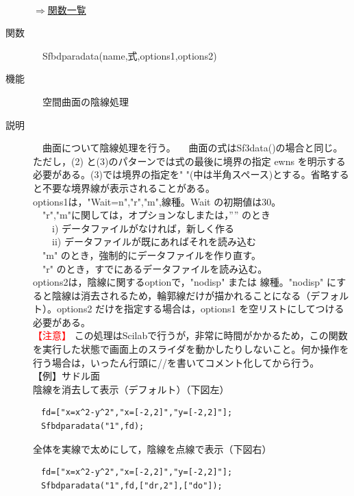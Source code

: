 \documentclass[papersize,a4paper,12pt,uplatex]{jsarticle}
\begin{document}
\begin{description}
　　　　　　\\

\begin{flushright} \hyperlink{functionlist3d}{$\Rightarrow$関数一覧}\end{flushright}

\hypertarget{sfbdparadata}{}
\item[関数]　Sfbdparadata(name,式,options1,options2)
\item[機能]　空間曲面の陰線処理
\item[説明]　曲面について陰線処理を行う。
　曲面の式はSf3data()の場合と同じ。ただし，(2) と(3)のパターンでは式の最後に境界の指定 ewns を明示する必要がある。(3)では境界の指定を" "(中は半角スペース)とする。省略すると不要な境界線が表示されることがある。\\
options1は，"Wait=n","r","m",線種。Wait の初期値は30。\\
　"r","m"に関しては，オプションなしまたは，”” のとき\\
　　i) データファイルがなければ，新しく作る\\
　　ii) データファイルが既にあればそれを読み込む\\
　"m"  のとき，強制的にデータファイルを作り直す。\\
　"r" のとき，すでにあるデータファイルを読み込む。\\ 
options2は，陰線に関するoptionで，"nodisp" または 線種。"nodisp" にすると陰線は消去されるため，輪郭線だけが描かれることになる（デフォルト）。options2 だけを指定する場合は，options1 を空リストにしてつける必要がある。\\

 \textcolor{red}{【注意】} この処理はScilabで行うが，非常に時間がかかるため，この関数を実行した状態で画面上のスライダを動かしたりしないこと。何か操作を行う場合は，いったん行頭に//を書いてコメント化してから行う。\\
 
【例】サドル面\\
陰線を消去して表示（デフォルト）（下図左）
\begin{verbatim}
　fd=["x=x^2-y^2","x=[-2,2]","y=[-2,2]"];
　Sfbdparadata("1",fd);
\end{verbatim}
全体を実線で太めにして，陰線を点線で表示（下図右）
\begin{verbatim}
　fd=["x=x^2-y^2","x=[-2,2]","y=[-2,2]"];
　Sfbdparadata("1",fd,["dr,2"],["do"]);
\end{verbatim}
　　　　　


\end{description}
\end{document}
